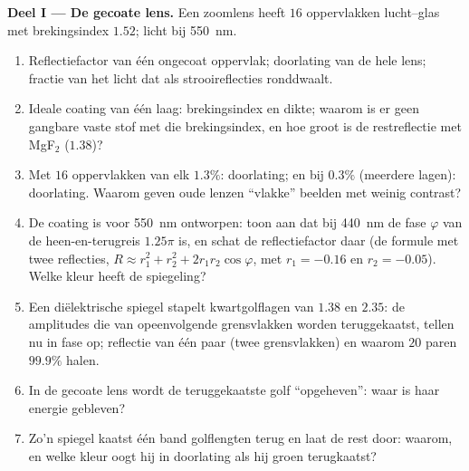 \begin{problem}
\label{pb:b2:wave-interfaces:1}

\medskip
\noindent\textbf{Deel I --- De gecoate lens.}
Een zoomlens heeft $16$ oppervlakken lucht--glas met brekingsindex $1.52$;
licht bij \qty{550}{nm}.
\begin{enumerate}
  \item Reflectiefactor van één ongecoat oppervlak; doorlating van de hele
        lens; fractie van het licht dat als strooireflecties ronddwaalt.
  \item Ideale coating van één laag: brekingsindex en dikte; waarom is er
        geen gangbare vaste stof met die brekingsindex, en hoe groot is de
        restreflectie met MgF$_2$ ($1.38$)?
  \item Met $16$ oppervlakken van elk $1.3\%$: doorlating; en bij $0.3\%$
        (meerdere lagen): doorlating. Waarom geven oude lenzen ``vlakke''
        beelden met weinig contrast?
  \item De coating is voor \qty{550}{nm} ontworpen: toon aan dat bij
        \qty{440}{nm} de fase $\varphi$ van de heen-en-terugreis $1.25\pi$
        is, en schat de reflectiefactor daar (de formule met twee
        reflecties, $R
        \approx r_1^2 + r_2^2 + 2r_1r_2\cos\varphi$, met
        $r_1 = -0.16$ en $r_2 =
        -0.05$). Welke kleur heeft de spiegeling?
  \item Een diëlektrische spiegel stapelt kwartgolflagen van $1.38$ en
        $2.35$: de amplitudes die van opeenvolgende grensvlakken worden
        teruggekaatst, tellen nu in fase op; reflectie van één paar (twee
        grensvlakken) en waarom $20$ paren $99.9\%$ halen.
  \item In de gecoate lens wordt de teruggekaatste golf ``opgeheven'': waar
        is haar energie gebleven?
  \item Zo'n spiegel kaatst één band golflengten terug en laat de rest door:
        waarom, en welke kleur oogt hij in doorlating als hij groen
        terugkaatst?
\end{enumerate}


\end{problem}
